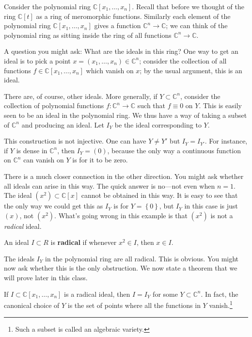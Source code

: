 \begin{example} 
Consider the polynomial ring $\mathbb{C}[x_1, \dots, x_n]$. Recall that before
we thought of the ring $\mathbb{C}[t]$ as a ring of meromorphic functions.  
Similarly each element of the polynomial ring $\mathbb{C}[x_1, \dots, x_n]$
gives a function $\mathbb{C}^n \to \mathbb{C}$; we can think of the polynomial
ring as sitting inside the ring of all functions $\mathbb{C}^n \to \mathbb{C}$.

A question you might ask: What are the ideals in this ring?  One way to get an
ideal is to pick a point $x=(x_1, \dots, x_n) \in \mathbb{C}^n$; consider the
collection of all functions $f \in \mathbb{C}[x_1, \dots, x_n]$ which vanish on
$x$; by the usual argument, this is an ideal.

There are, of course, other ideals. More generally, if $Y \subset
\mathbb{C}^n$, consider the collection of polynomial functions $f:
\mathbb{C}^n \to \mathbb{C}$ such that $f \equiv 0$ on
$Y$.  This is easily seen to be an ideal in the polynomial ring. We thus have a
way of taking a subset of $\mathbb{C}^n$ and producing an ideal.
Let $I_Y$ be the ideal corresponding to $Y$.  

This construction is not injective. One can have $Y \neq Y'$ but $I_Y = I_{Y'}$. For instance, if $Y$ is dense in
$\mathbb{C}^n$, then $I_Y = (0)$, because the only way a continuous function on
$\mathbb{C}^n$ can vanish on $Y$ is for it to be zero.

There is a much closer connection in the other direction. You might ask whether
all ideals can arise in this way. The quick answer is no---not even when $n=1$. The ideal $(x^2) \subset \mathbb{C}[x]$ cannot be obtained
in this way.  It is easy to see that the only way we could get this as $I_Y$ is
for $Y=\left\{0\right\}$, but $I_Y$ in this case is just $(x)$, not $(x^2)$.
What's going wrong in this example is that $(x^2)$ is not a \emph{radical}
ideal.
\end{example} 

\begin{definition} 
An ideal $I \subset R$ is \textbf{radical} if whenever $x^2 \in I$, then $x \in
I$.
\end{definition} 

The ideals $I_Y$ in the polynomial ring are all radical.  This is obvious.
You might now ask whether this is the only obstruction. We now state a theorem
that we will prove later in this class.

\begin{theorem} If $I \subset \mathbb{C}[x_1, \dots,
x_n]$ is a radical ideal, then $I = I_Y$ for some $Y \subset \mathbb{C}^n$. In
fact, the canonical choice of $Y$ is the set of points where all the functions
in $Y$ vanish.\footnote{Such a subset is called an algebraic variety.}
\end{theorem} 


